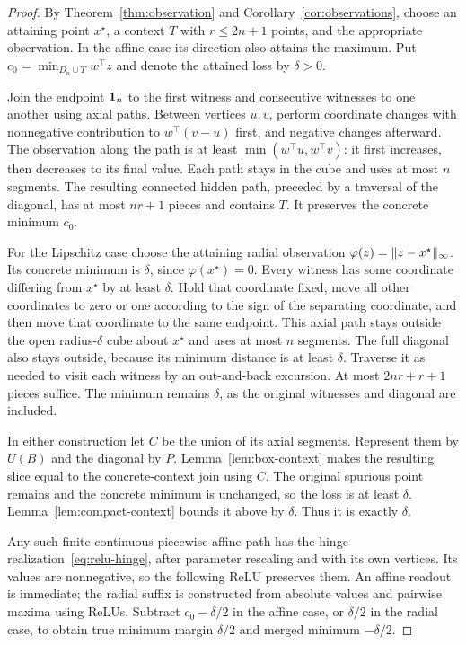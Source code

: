 \begin{proof}
By Theorem~\ref{thm:observation} and Corollary~\ref{cor:observations}, choose an attaining point $x^\star$, a context $T$ with $r\le2n+1$ points, and the appropriate observation. In the affine case its direction also attains the maximum. Put $c_0=\min_{D_n\cup T}w^\top z$ and denote the attained loss by $\delta>0$.

Join the endpoint $\mathbf 1_n$ to the first witness and consecutive witnesses to one another using axial paths. Between vertices $u,v$, perform coordinate changes with nonnegative contribution to $w^\top(v-u)$ first, and negative changes afterward. The observation along the path is at least $\min(w^\top u,w^\top v)$: it first increases, then decreases to its final value. Each path stays in the cube and uses at most $n$ segments. The resulting connected hidden path, preceded by a traversal of the diagonal, has at most $nr+1$ pieces and contains $T$. It preserves the concrete minimum $c_0$.

For the Lipschitz case choose the attaining radial observation $\varphi(z)=\lVert z-x^\star\rVert_\infty$. Its concrete minimum is $\delta$, since $\varphi(x^\star)=0$. Every witness has some coordinate differing from $x^\star$ by at least $\delta$. Hold that coordinate fixed, move all other coordinates to zero or one according to the sign of the separating coordinate, and then move that coordinate to the same endpoint. This axial path stays outside the open radius-$\delta$ cube about $x^\star$ and uses at most $n$ segments. The full diagonal also stays outside, because its minimum distance is at least $\delta$. Traverse it as needed to visit each witness by an out-and-back excursion. At most $2nr+r+1$ pieces suffice. The minimum remains $\delta$, as the original witnesses and diagonal are included.

In either construction let $C$ be the union of its axial segments. Represent them by $U(B)$ and the diagonal by $P$. Lemma~\ref{lem:box-context} makes the resulting slice equal to the concrete-context join using $C$. The original spurious point remains and the concrete minimum is unchanged, so the loss is at least $\delta$. Lemma~\ref{lem:compact-context} bounds it above by $\delta$. Thus it is exactly $\delta$.

Any such finite continuous piecewise-affine path has the hinge realization~\eqref{eq:relu-hinge}, after parameter rescaling and with its own vertices. Its values are nonnegative, so the following ReLU preserves them. An affine readout is immediate; the radial suffix is constructed from absolute values and pairwise maxima using ReLUs. Subtract $c_0-\delta/2$ in the affine case, or $\delta/2$ in the radial case, to obtain true minimum margin $\delta/2$ and merged minimum $-\delta/2$.
\end{proof}

